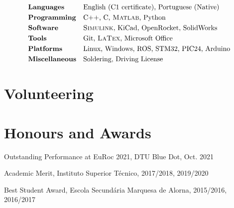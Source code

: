 \documentclass[a4paper,12pt]{article}
\begin{document}
\begin{align*}
&\text{\textbf{Languages}} &&\text{English (C1 certificate), Portuguese (Native)}\\
&\text{\textbf{Programming}} &&\text{C++, C, \textsc{Matlab}, Python} \\
&\text{\textbf{Software}} &&\text{\textsc{Simulink}, KiCad, OpenRocket, SolidWorks}\\
&\text{\textbf{Tools}} &&\text{Git, \textsc{LaTex}, Microsoft Office}\\
&\text{\textbf{Platforms}} &&\text{Linux, Windows, ROS, STM32, PIC24, Arduino}\\
&\text{\textbf{Miscellaneous}} &&\text{Soldering, Driving License}
\end{align*}



\section{Volunteering}

\ItemListStart
\ItemListEnd



\section{Honours and Awards}

\begin{description}[font=$\circ$]
\itemsep-2pt 
\item {Outstanding Performance at EuRoc 2021, DTU Blue Dot, Oct. 2021}
\item {Academic Merit, Instituto Superior Técnico, 2017/2018, 2019/2020}
\item {Best Student Award, Escola Secundária Marquesa de Alorna, 2015/2016, 2016/2017}
\end{description}



%
\end{document}
